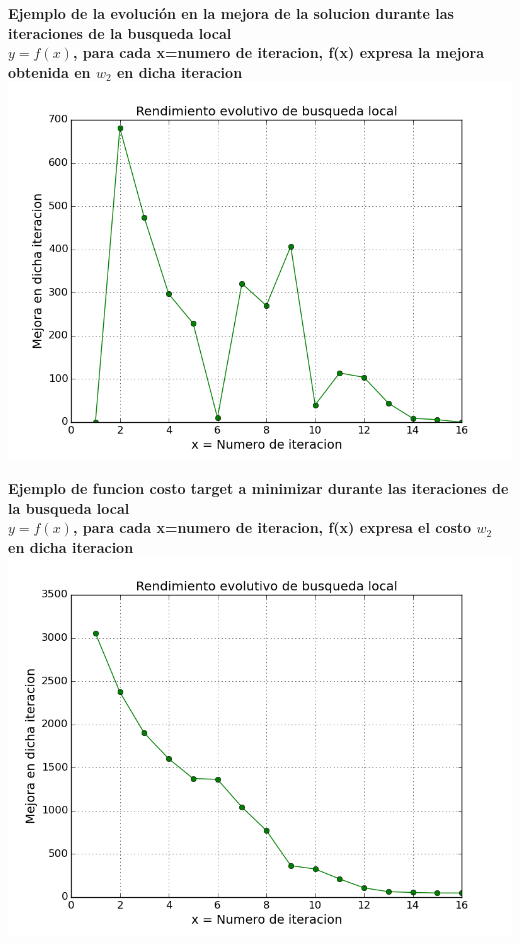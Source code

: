 \begin{center}
	\textbf{Ejemplo de la evoluci\'on en la mejora de la solucion durante las iteraciones de la busqueda local}\\
	\textbf{$y = f(x)$, para cada x=numero de iteracion, f(x) expresa la mejora obtenida en $w_2$ en dicha iteracion}\\
	\includegraphics[scale=0.7]{experimentos/bqlocal/rendimiento_evolutivo_absoluto_cliques/bqlocal/instancia_190_11970_in_iters_w2_differential.png}
\end{center}

\begin{center}
	\textbf{Ejemplo de funcion costo target a minimizar durante las iteraciones de la busqueda local}\\
	\textbf{$y = f(x)$, para cada x=numero de iteracion, f(x) expresa el costo $w_2$ en dicha iteracion}\\
	\includegraphics[scale=0.7]{experimentos/bqlocal/rendimiento_evolutivo_absoluto_cliques/bqlocal/instancia_190_11970_in_iters_w2_absolute_value.png}
\end{center}

